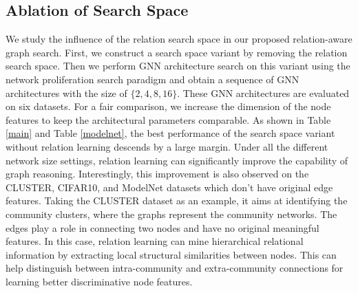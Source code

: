 \subsection{Ablation of Search Space}

We study the influence of the relation search space in our proposed relation-aware graph search. 
First, we construct a search space variant by removing the relation search space. 
Then we perform GNN architecture search on this variant using the network proliferation search paradigm and obtain a sequence of GNN architectures with the size of $\{2,4,8,16\}$. 
These GNN architectures are evaluated on six datasets. 
For a fair comparison, we increase the dimension of the node features to keep the architectural parameters comparable. 
As shown in Table \ref{main} and Table \ref{modelnet}, the best performance of the search space variant without relation learning descends by a large margin. Under all the different network size settings, relation learning can significantly improve the capability of graph reasoning. 
Interestingly, this improvement is also observed on the CLUSTER, CIFAR10, and ModelNet datasets which don't have original edge features. 
Taking the CLUSTER dataset as an example, it aims at identifying the community clusters, where the graphs represent the community networks. 
The edges play a role in connecting two nodes and have no original meaningful features. 
In this case, relation learning can mine hierarchical relational information by extracting local structural similarities between nodes. 
This can help distinguish between intra-community and extra-community connections for learning better discriminative node features. 

